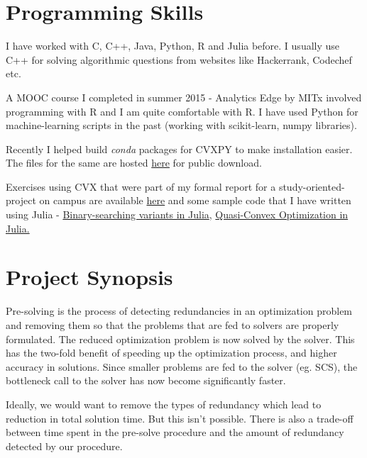 \documentclass[twoside]{article}
\begin{document}
\begin{multicols}{2}
\section{\textbf{Programming Skills}}

I have worked with C, C++, Java, Python, R and Julia before. %
I usually use C++ for solving algorithmic questions from websites like Hackerrank, Codechef etc. 

A MOOC course I completed in summer 2015 - Analytics Edge by MITx involved programming with R and I am quite comfortable with R. I have used Python for machine-learning scripts in the past (working with scikit-learn, numpy libraries). 

Recently I helped build \textit{conda} packages for CVXPY to make installation easier. The files for the same are hosted \href{https://anaconda.org/Ramcha24/}{here} for public download.

Exercises using CVX that were part of my formal report for a study-oriented-project on campus are available \href{https://github.com/ramcha24/cvx-exercises}{here}
and some sample code that I have written using Julia - \href{https://github.com/ramcha24/julia-exercises/blob/master/Binary\%20Searching\%20with\%20Julia.ipynb
}{Binary-searching variants in Julia}, \href{https://github.com/ramcha24/julia-exercises/blob/master/Quasiconvex\%20Optimization\%20by\%20Bisection.ipynb
}{Quasi-Convex Optimization in Julia.}
\vspace*{-\baselineskip}

\section{\textbf{Project Synopsis}}
\hspace{5mm}Pre-solving is the process of detecting redundancies in an optimization problem and removing them so that the problems that are fed to solvers are properly formulated. The reduced optimization problem is now solved by the solver. This has the two-fold benefit of speeding up the optimization process, and higher accuracy in solutions. Since smaller problems are fed to the solver (eg. SCS), the bottleneck call to the solver has now become significantly faster. 

Ideally, we would want to remove the types of redundancy which lead to reduction in total solution time. But this isn't possible. There is also a trade-off between time spent in the pre-solve procedure and the amount of redundancy detected by our procedure. 


\end{multicols}
\end{document}
